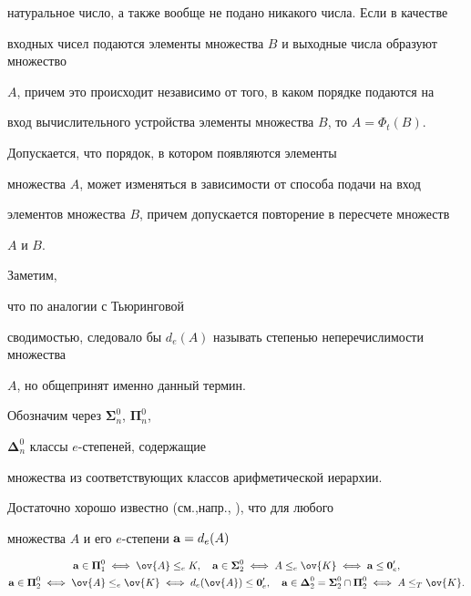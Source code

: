 натуральное число, а также вообще не подано никакого числа. Если в качестве


входных чисел подаются элементы множества $B$ и выходные числа образуют множество


$A$, причем это происходит независимо от того, в каком порядке подаются на


вход вычислительного устройства элементы множества $B$, то $A=\Phi_t(B)$.


Допускается, что порядок, в котором появляются элементы


множества $A$, может изменяться в зависимости от способа подачи на вход


элементов множества $B$, причем допускается повторение в пересчете множеств


$A$ и $B$.





Заметим,


что по аналогии с Тьюринговой


сводимостью, следовало бы $d_e(A)$ называть степенью неперечислимости множества


$A$, но общепринят именно данный термин. 





Обозначим через ${\boldsymbol\Sigma}_n^0$, ${\boldsymbol\Pi}_n^0$,


${\boldsymbol\Delta}_n^0$ классы $e$-степеней, содержащие


множества из соответствующих классов арифметической иерархии.


Достаточно хорошо известно (см.,напр., \cite{r4}), что для любого


множества $A$ и его $e$-степени ${\bold a}=d_e(A)$


\begin{gather*}


{\bold a}\in{\boldsymbol\Pi}^0_1\iff\ov{A}\leq_eK,\quad


{\bold a}\in{\boldsymbol\Sigma}^0_2\iff A\leq_e\ov{K}


\iff{\bold a}\leq{\bold 0}_e', \\


%


{\bold a}\in{\boldsymbol\Pi}^0_2\iff\ov{A}\leq_e\ov{K}\iff


d_e(\ov{A})\leq{\bold 0}_e',\quad{\bold a}\in{\boldsymbol\Delta}^0_2=


{\boldsymbol\Sigma}^0_2\cap{\boldsymbol\Pi}^0_2\iff A\leq_T\ov{K}.


\end{gather*}






